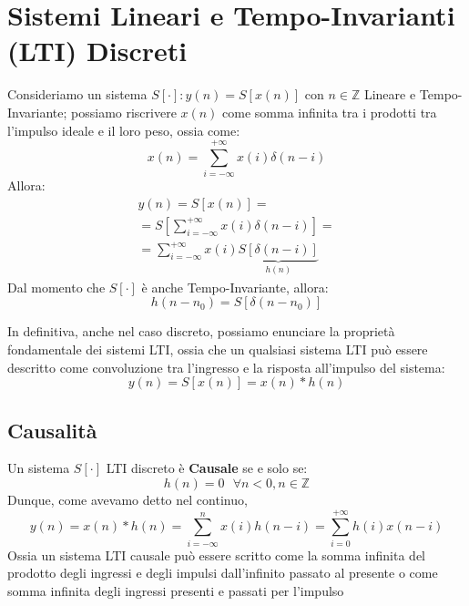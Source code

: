 \section{Sistemi Lineari e Tempo-Invarianti (LTI) Discreti}
Consideriamo un sistema $S[\cdot] : y(n) = S[x(n)]$ con $n \in \mathbb{Z}$ Lineare e Tempo-Invariante; possiamo riscrivere $x(n)$
come somma infinita tra i prodotti tra l'impulso ideale e il loro peso, ossia come:
\begin{equation*}
    x(n) = \sum_{i = -\infty}^{+\infty} x(i)\delta(n-i)
\end{equation*}
Allora:
\begin{gather*}
    y(n) = S[x(n)] = \\ 
         = S\left[\sum_{i = -\infty}^{+\infty} x(i)\delta(n-i)\right] = \\
         =\sum_{i = -\infty}^{+\infty} x(i) \underbrace{S[\delta(n-i)]}_{h(n)}
\end{gather*}
Dal momento che $S[\cdot]$ è anche Tempo-Invariante, allora:
\begin{equation*}
    h(n - n_0) = S\left[\delta(n - n_0)\right]
\end{equation*}
\begin{highlightedeq}
    In definitiva, anche nel caso discreto, possiamo enunciare la proprietà fondamentale dei sistemi LTI, ossia che un qualsiasi sistema LTI
    può essere descritto come convoluzione tra l'ingresso e la risposta all'impulso del sistema:
    \begin{equation} \label{prop: fondLTI}
        y(n) = S[x(n)] = x(n) \ast h(n)
    \end{equation}
\end{highlightedeq}

\subsection{Causalità}
Un sistema $S[\cdot]$ LTI discreto è \textbf{Causale} se e solo se:
\begin{equation}
    h(n) = 0 \mbox{  } \forall n < 0, n \in \mathbb{Z}
\end{equation}
Dunque, come avevamo detto nel continuo,
\begin{equation}
    y(n) = x(n) \ast h(n) = \sum_{i = -\infty}^{n} x(i) h(n - i) = \sum_{i = 0}^{+\infty} h(i) x(n - i)
\end{equation}
Ossia un sistema LTI causale può essere scritto come la somma infinita del prodotto degli ingressi e degli impulsi dall'infinito passato al presente o come 
somma infinita degli ingressi presenti e passati per l'impulso

